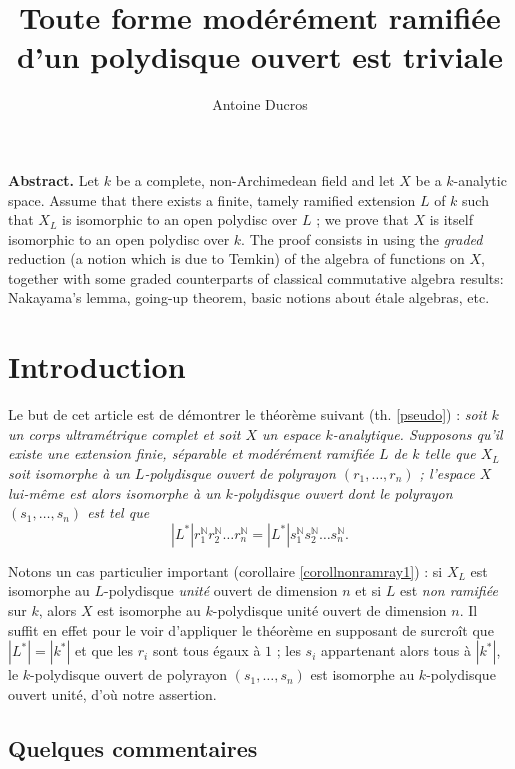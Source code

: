 \documentclass[10pt,leqno]{article}
\date{}
\date{}
\title{Toute forme modérément ramifiée d'un polydisque ouvert est triviale}
\author{Antoine Ducros}
\renewcommand{\Bbb}{\mathbb}
\newcommand{\NN}{{\Bbb N}}
\begin{document}
\maketitle

{\small {\bf Abstract.} Let $k$ be a complete, non-Archimedean field and let $X$ be a $k$-analytic space. Assume that there exists a finite, tamely ramified extension $L$ of $k$ such that $X_L$ is isomorphic to an open polydisc over $L$ ; we prove that $X$ is itself isomorphic to an open polydisc over $k$. The proof consists in using the {\em graded} reduction (a notion which is due to Temkin) of the algebra of functions on $X$, together with some graded counterparts of classical commutative algebra results: Nakayama's lemma, going-up theorem, basic notions about \'etale algebras, etc.}

\section*{Introduction}

Le but de cet article est de démontrer le théorème suivant (th. \ref{pseudo}) : {\em soit $k$ un corps ultramétrique complet et soit $X$ un espace $k$-analytique. Supposons qu'il existe une extension finie, séparable et modérément ramifiée $L$ de $k$ telle que $X_{L}$ soit isomorphe à un $L$-polydisque ouvert de polyrayon $(r_1,\ldots,r_n)$ ; l'espace $X$ lui-même est alors isomorphe à un $k$-polydisque ouvert dont le polyrayon $(s_1,\ldots, s_n)$ est tel que $$|L^*|r_1^{\NN}r_2^{\NN}\ldots r_n ^{\NN}=|L^*|s_1^{\NN}s_2^{\NN}\ldots s_n ^{\NN}.$$ } 

\medskip
Notons un cas particulier important (corollaire \ref{corollnonramray1}) : si $X_L$ est isomorphe au $L$-polydisque {\em unité} ouvert de dimension $n$ et si $L$ est {\em non ramifiée} sur $k$, alors $X$ est isomorphe au $k$-polydisque unité ouvert de dimension $n$. Il suffit en effet pour le voir d'appliquer le théorème en supposant de surcroît que $|L^*|=|k^*|$ et que les $r_i$ sont tous égaux à $1$ ; les $s_i$ appartenant alors tous à $|k^*|$, le $k$-polydisque ouvert de polyrayon $(s_1,\ldots,s_n)$ est isomorphe au $k$-polydisque ouvert unité, d'où notre assertion. 

\subsection*{Quelques commentaires}
\end{document}
